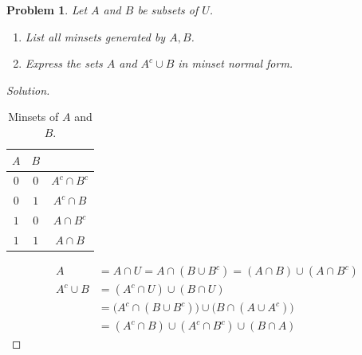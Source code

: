 \documentclass[oneside]{book}
\theoremstyle{mystyle}
\newtheorem{problem}{Problem}[section]
\begin{document}
\begin{problem}
Let $A$ and $B$ be subsets of $U$. 
\begin{enumerate}
    \item List all minsets generated by $A, B$.
    \item Express the sets $A$ and $A^c\cup B$ in minset normal form.
\end{enumerate}
\end{problem}
\begin{proof}[Solution]
\begin{table}[H]
    \centering
    \begin{tabular}{c c c}
        \hline
        $A$ & $B$ & \\ [0.5ex]
        \hline
        $0$ & $0$ & $A^c \cap B^c$\\
        $0$ & $1$ & $A^c \cap B$\\
        $1$ & $0$ & $A\cap B^c$\\
        $1$ & $1$ & $A\cap B$\\
        \hline
    \end{tabular}
    \caption{Minsets of $A$ and $B$.}
    \label{tab:discrete_structures_exam_II_problem_blah}
\end{table}
\begin{align*}
    A &= A\cap U = A\cap(B\cup B^c) = (A\cap B)\cup(A\cap B^c)\\
    A^c \cup B &= (A^c \cap U)\cup (B\cap U)\\
    &= \big(A^c\cap (B\cup B^c)\big)\cup\big(B\cap (A\cup A^c)\big)\\
    &= (A^c\cap B)\cup(A^c\cap B^c)\cup (B\cap A)
\end{align*}
\end{proof}
\end{document}
